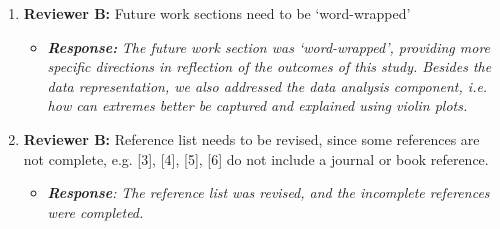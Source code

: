 \documentclass[a4paper, 12pt, conference]{ieeeconf}      %
\begin{document}
\begin{enumerate}
  \item \textbf{Reviewer B:}  Future work sections need to be `word-wrapped'
   \begin{itemize}
  	\item \emph{\textbf{Response:}}
  	\emph{The future work section was  `word-wrapped', providing more specific directions in reflection of the outcomes of this study. Besides the data representation, we also  addressed the data analysis component, i.e. how can extremes better be captured and explained using violin plots.}
  \end{itemize}

  \item \textbf{Reviewer B:}  Reference list needs to be revised, since some references are not complete, e.g. [3], [4], [5], [6] do not include a journal or book reference.
  \begin{itemize}
  	\item \emph{\textbf{Response}:} \emph{The reference list was revised, and the incomplete references were completed.}
  \end{itemize}
\end{enumerate}
	



%
%
\end{document}
